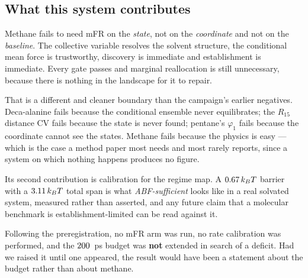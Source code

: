 \subsection{What this system contributes}

Methane fails to need mFR on the \emph{state}, not on the \emph{coordinate} and not on the
\emph{baseline}. The collective variable resolves the solvent structure, the conditional mean
force is trustworthy, discovery is immediate and establishment is immediate. Every gate passes
and marginal reallocation is still unnecessary, because there is nothing in the landscape for it
to repair.

That is a different and cleaner boundary than the campaign's earlier negatives. Deca-alanine
fails because the conditional ensemble never equilibrates; the $R_{15}$ distance CV fails because
the state is never found; pentane's $\varphi_1$ fails because the coordinate cannot see the
states. Methane fails because the physics is easy --- which is the case a method paper most needs
and most rarely reports, since a system on which nothing happens produces no figure.

Its second contribution is calibration for the regime map. A $0.67\,k_BT$ barrier
with a $3.11\,k_BT$ total span is what \emph{ABF-sufficient} looks like in a real solvated
system, measured rather than asserted, and any future claim that a molecular benchmark is
establishment-limited can be read against it.

Following the preregistration, no mFR arm was run, no rate calibration was performed, and the
$200$~ps budget was \textbf{not} extended in search of a deficit. Had we raised it until one
appeared, the result would have been a statement about the budget rather than about methane.

